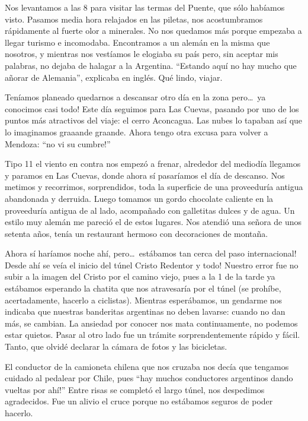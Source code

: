 Nos levantamos a las 8 para visitar las termas del Puente, que s\'olo hab\'iamos
visto. Pasamos media hora relajados en las piletas, nos acostumbramos
r\'apidamente al fuerte olor a minerales. No nos quedamos m\'as porque empezaba
a llegar turismo e incomodaba. Encontramos a un alem\'an en la misma que
nosotros, y mientras nos vest\'iamos le elogiaba su pa\'is pero, sin aceptar
mis palabras, no dejaba de halagar a la Argentina. ``Estando aqu\'i no hay mucho
que a\~norar de Alemania'', explicaba en ingl\'es. Qu\'e lindo, viajar.

Ten\'iamos planeado quedarnos a descansar otro d\'ia en la zona pero\ldots\
\textexclamdown ya conocimos casi todo! Este d\'ia seguimos para Las Cuevas,
pasando por uno de los puntos m\'as atractivos del viaje: el cerro Aconcagua.
Las nubes lo tapaban as\'i que lo imaginamos graaande graande. Ahora tengo otra
excusa para volver a Mendoza: ``\textexclamdown no vi su cumbre!''

Tipo 11 el viento en contra nos empez\'o a frenar, alrededor del mediod\'ia
llegamos y paramos en Las Cuevas, donde ahora s\'i pasar\'iamos el d\'ia de
descanso. Nos metimos y recorrimos, sorprendidos, toda la superficie de una
proveedur\'ia antigua abandonada y derruida. Luego tomamos un gordo chocolate
caliente en la proveedur\'ia antigua de al lado, acompa\~nado con galletitas
dulces y de agua. Un estilo muy alem\'an me pareci\'o el de estos lugares.
Nos atendi\'o una se\~nora de unos setenta a\~nos, ten\'ia un restaurant hermoso
con decoraciones de monta\~na.

Ahora s\'i har\'iamos noche ah\'i, pero\ldots\ \textexclamdown est\'abamos tan
cerca del paso internacional! \textexclamdown Desde ah\'i se ve\'ia el inicio
del t\'unel Cristo Redentor y todo! Nuestro error fue no subir a la imagen del
Cristo por el camino viejo, pues a la 1 de la tarde ya est\'abamos esperando la
chatita que nos atravesar\'ia por el t\'unel (se proh\'ibe, acertadamente,
hacerlo a ciclistas). Mientras esper\'abamos, un gendarme nos indicaba que
nuestras banderitas argentinas no deben lavarse: cuando no dan m\'as, se
cambian. La ansiedad por conocer nos mata continuamente, no podemos estar
quietos. Pasar al otro lado fue un tr\'amite sorprendentemente r\'apido y
f\'acil. Tanto, que olvid\'e declarar la c\'amara de fotos y las bicicletas.

El conductor de la camioneta chilena que nos cruzaba nos dec\'ia que tengamos
cuidado al pedalear por Chile, pues ``\textexclamdown hay muchos conductores
argentinos dando vueltas por ah\'i!'' Entre risas se complet\'o el largo
t\'unel, nos despedimos agradecidos. Fue un alivio el cruce porque no
est\'abamos seguros de poder hacerlo.

